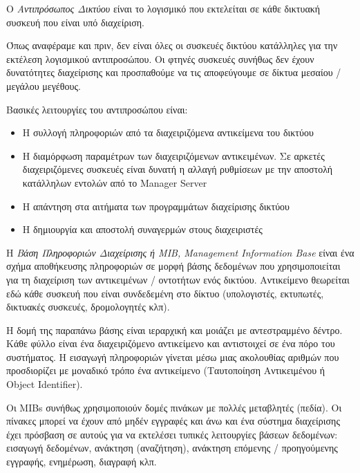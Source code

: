 \begin{inthebox}
Ο \emph{Αντιπρόσωπος Δικτύου} είναι το λογισμικό που εκτελείται σε κάθε δικτυακή συσκευή που είναι υπό διαχείριση.\\
\end{inthebox}

Όπως αναφέραμε και πριν, δεν είναι όλες οι συσκευές δικτύου κατάλληλες για την εκτέλεση λογισμικού αντιπροσώπου. Οι φτηνές συσκευές συνήθως δεν έχουν δυνατότητες διαχείρισης και προσπαθούμε να τις αποφεύγουμε σε δίκτυα μεσαίου / μεγάλου μεγέθους. 

Βασικές λειτουργίες του αντιπροσώπου είναι:

\begin{itemize}
\item Η συλλογή πληροφοριών από τα διαχειριζόμενα αντικείμενα του δικτύου
\item Η διαμόρφωση παραμέτρων των διαχειριζόμενων αντικειμένων. Σε αρκετές διαχειριζόμενες συσκευές είναι δυνατή η αλλαγή ρυθμίσεων με την αποστολή κατάλληλων εντολών από το Manager Server
\item Η απάντηση στα αιτήματα των προγραμμάτων διαχείρισης δικτύου
\item Η δημιουργία και αποστολή συναγερμών στους διαχειριστές
\end{itemize}

\begin{inthebox}
Η \emph{Βάση Πληροφοριών Διαχείρισης ή MIB, Management Information Base} είναι ένα σχήμα αποθήκευσης πληροφοριών σε μορφή βάσης δεδομένων που χρησιμοποιείται για τη διαχείριση των αντικειμένων / οντοτήτων ενός δικτύου. Αντικείμενο θεωρείται εδώ κάθε συσκευή που είναι συνδεδεμένη στο δίκτυο (υπολογιστές, εκτυπωτές, δικτυακές συσκευές, δρομολογητές κλπ).\\
\end{inthebox}

Η δομή της παραπάνω βάσης είναι ιεραρχική και μοιάζει με αντεστραμμένο δέντρο. Κάθε φύλλο είναι ένα διαχειριζόμενο αντικείμενο και αντιστοιχεί σε ένα πόρο του συστήματος. Η εισαγωγή πληροφοριών γίνεται μέσω μιας ακολουθίας αριθμών που προσδιορίζει με μοναδικό τρόπο ένα αντικείμενο (Ταυτοποίηση Αντικειμένου ή Object Identifier).

Οι MIBs συνήθως χρησιμοποιούν δομές πινάκων με πολλές μεταβλητές (πεδία). Οι πίνακες μπορεί να έχουν από μηδέν εγγραφές και άνω και ένα σύστημα διαχείρισης έχει πρόσβαση σε αυτούς για να εκτελέσει τυπικές λειτουργίες βάσεων δεδομένων: εισαγωγή δεδομένων, ανάκτηση (αναζήτηση), ανάκτηση επόμενης / προηγούμενης εγγραφής, ενημέρωση, διαγραφή κλπ.